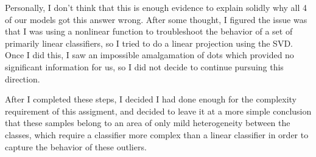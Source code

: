\documentclass[12pt]{article}
\begin{document}
Personally, I don't think that this is enough evidence to explain solidly why all 4 of our models got this answer wrong. 
After some thought, I figured the issue was that I was using a nonlinear function to troubleshoot the behavior of a set of primarily linear 
classifiers, so I tried to do a linear projection using the SVD. Once I did this, I saw an impossible amalgamation of dots 
which provided no significant information for us, so I did not decide to continue pursuing this direction.

After I completed these steps, I decided I had done enough for the complexity requirement of this assigment, and decided to leave it at 
a more simple conclusion that these samples belong to an area of only mild heterogeneity between the classes, which require a 
classifier more complex than a linear classifier in order to capture the behavior of these outliers.
\end{document}
